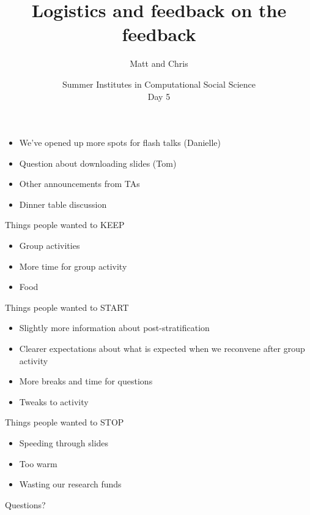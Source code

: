 \documentclass{beamer}
\title[]{Logistics and feedback on the feedback}
\author[]{Matt and Chris}
\date[]{Summer Institutes in Computational Social Science\\Day 5
}
\begin{document}
\frame{\titlepage}
\begin{frame}

\begin{itemize}
\item We've opened up more spots for flash talks (Danielle)
\pause
\item Question about downloading slides (Tom)
\pause
\item Other announcements from TAs
\pause
\item Dinner table discussion
\end{itemize}

\end{frame}
\begin{frame}

Things people wanted to KEEP
\begin{itemize}
\item Group activities
\item More time for group activity
\item Food
\end{itemize}

\end{frame}
\begin{frame}

Things people wanted to START
\begin{itemize}
\item Slightly more information about post-stratification
\pause
\item Clearer expectations about what is expected when we reconvene after group activity
\pause
\item More breaks and time for questions
\pause
\item Tweaks to activity
\end{itemize}

\end{frame}
\begin{frame}

Things people wanted to STOP
\begin{itemize}
\item Speeding through slides
\item Too warm
\item Wasting our research funds
\end{itemize}

\end{frame}
\begin{frame}

\begin{center}
\LARGE
Questions?
\end{center}

\end{frame}
\end{document}
